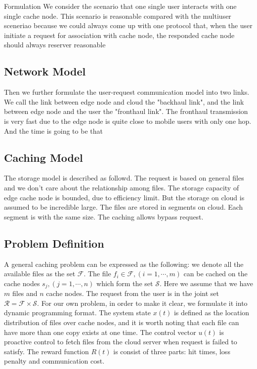 \documentclass{article}
\begin{document}
\begin{section}{Formulation}
    \label{formulation}
    We consider the scenario that one single user interacts with one single cache node.
    This scenario is reasonable compared with the multiuser sceneriao because we could always come up with one protocol that, when the user initiate a request for association with cache node, the responded cache node should always reserver reasonable

    \subsection{Network Model}
    Then we further formulate the user-request communication model into two links. We call the link between edge node and cloud the "backhaul link", and the link between edge node and the user the "fronthaul link".
    The fronthaul transmission is very fast due to the edge node is quite close to mobile users with only one hop. And the time is going to be that 
    
    \subsection{Caching Model}
    The storage model is described as followd. The request is based on general files and we don't care about the relationship among files.
    The storage capacity of edge cache node is bounded, due to efficiency limit. But the storage on cloud is assumed to be incredible large. The files are stored in segments on cloud. Each segment is with the same size.
    The caching allows bypass request.

    \subsection{Problem Definition}
    A general caching problem can be expressed as the following: we denote all the available files as the set $\mathcal{F}$. The file $f_i\in\mathcal{F},(i=1,\cdots,m)$ can be cached on the cache nodes $s_j,(j=1,\cdots,n)$ which form the set $\mathcal{S}$. Here we assume that we have $m$ files and $n$ cache nodes. The request from the user is in the joint set $\mathcal{R}=\mathcal{F}\times\mathcal{S}$. For our own problem, in order to make it clear, we formulate it into dynamic programming format. The system state $x(t)$ is defined as the location distribution of files over cache nodes, and it is worth noting that each file can have more than one copy exists at one time. The control vector $u(t)$ is proactive control to fetch files from the cloud server when request is failed to satisfy. The reward function $R(t)$ is consist of three parts: hit times, loss penalty and communication cost.


\end{section}
\end{document}
